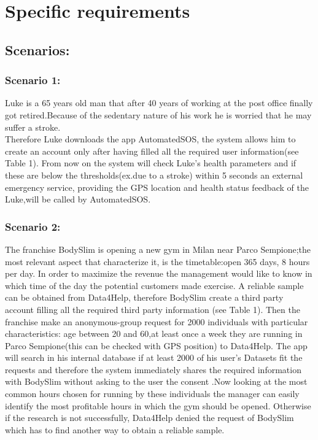 \section{Specific requirements}
\label{sec:specreq}

\subsection{Scenarios:}
\subsubsection{Scenario 1:}
Luke is a 65 years old man that after 40 years of  working at the post office finally got retired.Because of the sedentary nature of his work he is worried that he may suffer a stroke.\\ Therefore Luke downloads the app AutomatedSOS, the system allows him to create an account only after having filled all the required user information(see Table 1). From now on the system will check Luke's health parameters and  if these are below the thresholds(ex.due to a stroke) within 5 seconds an external emergency service, providing the GPS location and health status feedback of the Luke,will be called by AutomatedSOS.

\subsubsection{Scenario 2:}
The franchise BodySlim is opening a new gym in Milan near Parco Sempione;the most relevant aspect that characterize it, is the timetable:open 365 days, 8 hours per day. In order to maximize the revenue the management would like to know in which time of the day the potential customers made exercise. A reliable sample can be obtained from Data4Help, therefore BodySlim create a third party account filling all the required third party information (see Table 1). Then the franchise make an anonymous-group request for 2000 individuals with particular characteristics: age between 20 and 60,at least once a week they are running in Parco Sempione(this can be checked with GPS position) to Data4Help. The app will search in his internal database if at least 2000 of his user's Datasets fit the requests and therefore the system immediately shares the required information with BodySlim without asking to the user the consent .Now looking at the most common hours chosen for running by these individuals the manager can easily identify the most profitable hours in which the gym should be opened. Otherwise if the research is not successfully, Data4Help denied the request of BodySlim which has to find another way to obtain a reliable sample.

